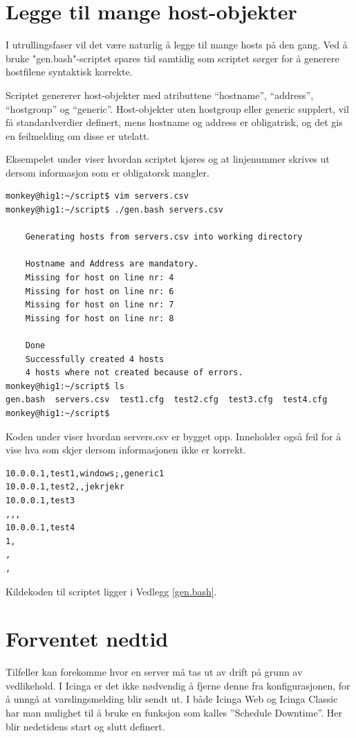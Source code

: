 \section{Legge til mange host-objekter}
I utrullingsfaser vil det være naturlig å legge til mange hosts på den gang. Ved å bruke "gen.bash"-scriptet spares tid samtidig som scriptet sørger for å generere hostfilene syntaktisk korrekte.

Scriptet genererer host-objekter med atributtene  ``hostname'', ``address'', ``hostgroup'' og ``generic''. Host-objekter uten hostgroup eller generic supplert, vil få standardverdier definert, mens hostname og address er obligatrisk, og det gis en feilmelding om disse er utelatt.

Eksempelet under viser hvordan scriptet kjøres og at linjenummer skrives ut dersom informasjon som er obligatorsk mangler.
\begin{lstlisting}
monkey@hig1:~/script$ vim servers.csv
monkey@hig1:~/script$ ./gen.bash servers.csv

	Generating hosts from servers.csv into working directory

	Hostname and Address are mandatory.
	Missing for host on line nr: 4
	Missing for host on line nr: 6
	Missing for host on line nr: 7
	Missing for host on line nr: 8

	Done
	Successfully created 4 hosts
	4 hosts where not created because of errors.
monkey@hig1:~/script$ ls
gen.bash  servers.csv  test1.cfg  test2.cfg  test3.cfg  test4.cfg
monkey@hig1:~/script$
\end{lstlisting}

Koden under viser hvordan servers.csv er bygget opp. Inneholder også feil for å vise hva som skjer dersom informasjonen ikke er korrekt.
\begin{lstlisting}
10.0.0.1,test1,windows;,generic1
10.0.0.1,test2,,jekrjekr
10.0.0.1,test3
,,,
10.0.0.1,test4
1,
,
,
\end{lstlisting}

Kildekoden til scriptet ligger i Vedlegg \ref{gen.bash}.

\section{Forventet nedtid}
Tilfeller kan forekomme hvor en server må tas ut av drift på grunn av vedlikehold. I Icinga er det ikke nødvendig å fjerne denne fra konfigurasjonen, for å unngå at varslingsmelding blir sendt ut. I både Icinga Web og Icinga Classic har man mulighet til å bruke en funksjon som kalles ''Schedule Downtime''. Her blir nedetidens start og slutt definert.

